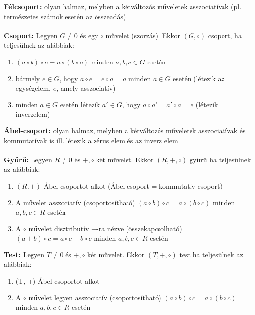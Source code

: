 \documentclass[12pt,a4paper]{article}
\begin{document}
\begin{tcolorbox}[colback=green!5!white,colframe=green!60!black,title= 3. Csoport{,} gyűrű{,} test]
        \textbf{Félcsoport:} olyan halmaz, melyben a kétváltozós műveletek asszociatívak (pl. természetes számok esetén az összeadás)\\\\
        \textbf{Csoport:} Legyen \(G\neq 0\) és egy \(\circ \) művelet (szorzás). Ekkor \((G, \circ )\) csoport, ha teljesülnek az alábbiak:
        \begin{enumerate}
            \item \((a \circ b) \circ c = a \circ (b \circ c)\) minden \(a, b, c \in G\) esetén
            \item bármely \(e \in G\), hogy \(a \circ e = e \circ a = a\) minden \(a \in G\) esetén (létezik az egységelem, \(e\), amely asszociatív)
            \item minden \(a \in G\) esetén létezik \(a' \in G\), hogy \(a \circ a'=a' \circ a = e\) (létezik inverzelem)
        \end{enumerate}
        \textbf{Ábel-csoport:} olyan halmaz, melyben a kétváltozós műveletek asszociatívak és kommutatívak is ill. létezik a zérus elem és az inverz elem\\\\
        \textbf{Gyűrű:}
        Legyen \(R\neq 0\) és \(+, \circ \) két művelet. Ekkor \((R, +, \circ )\) gyűrű ha teljesülnek az alábbiak:
        \begin{enumerate}
            \item \((R, +)\) Ábel csoportot alkot (Ábel csoport = kommutatív csoport)
            \item A  művelet asszociatív (csoportosítható) \((a \circ b) \circ c = a \circ (b \circ c)\) minden \(a, b, c \in R\) esetén
            \item A \(\circ \) művelet disztributív \(+\)-ra nézve (összekapcsolható) \((a + b) \circ c = a \circ c + b \circ c\) minden \(a, b, c \in R\) esetén
        \end{enumerate}
        \textbf{Test:} 
        Legyen \(T \neq 0\) és \(+, \circ \) két művelet. Ekkor \((T, +, \circ)\) test ha teljesülnek az alábbiak:
        \begin{enumerate}
            \item (T, +) Ábel csoportot alkot
            \item A \(\circ\) művelet legyen asszociatív (csoportosítható) \((a \circ b) \circ c = a \circ (b \circ c)\) minden \(a, b, c \in R\) esetén

\end{enumerate}
\end{tcolorbox}
\end{document}
